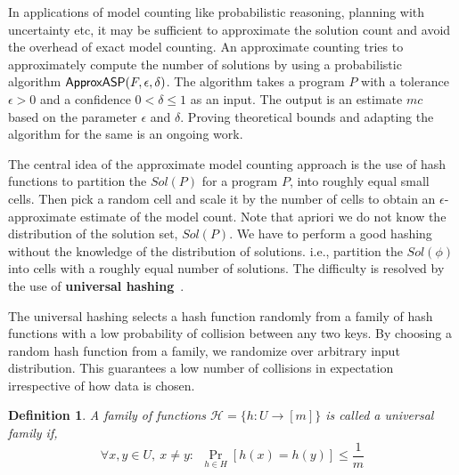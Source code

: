 \documentclass{article}
\newtheorem{definition}{Definition}
\newcommand{\fff}{$P$\xspace}
\newcommand{\mc}{$mc$\xspace}
\newcommand{\ep}{$\epsilon$\xspace}
\newcommand{\del}{$\delta$\xspace}
\def\appasp{\normalfont \textsf{ApproxASP}\xspace}
\newcommand{\sol}{$Sol(P)$\xspace}
\begin{document}
In applications of model counting like probabilistic reasoning, planning with uncertainty etc, it may be sufficient to approximate the solution count and avoid the overhead of exact model counting.
%
An approximate counting tries to approximately compute the number of solutions by using a probabilistic algorithm $\appasp(F, \epsilon, \delta)$.
%
The algorithm takes a program \fff with a tolerance $\epsilon > 0$ and a confidence $0 < \delta \leq 1$ as an input.
%
The output is an estimate \mc based on the parameter \ep and \del.
%
Proving theoretical bounds and adapting the algorithm for the same is an ongoing work.

The central idea of the approximate model counting approach is the use of hash functions to partition the \sol for a program \fff, into roughly equal small cells.
%
Then pick a random cell and scale it by the number of cells to obtain an \ep-approximate estimate of the model count.
%
Note that apriori we do not know the distribution of the solution set, \sol.
%
We have to perform a good hashing without the knowledge of the distribution of solutions. i.e., partition the $Sol(\phi)$ into cells with a roughly equal number of solutions.
%
%
%
The difficulty is resolved by the use of \textbf{universal hashing}~\cite{DBLP:conf/stoc/CarterW77}.

The universal hashing selects a hash function randomly from a family of hash functions with a low probability of collision between any two keys. 
%
By choosing a random hash function from a family, we randomize over arbitrary input distribution. This guarantees a low number of collisions in expectation irrespective of how data is chosen.

\begin{definition}
A family of functions $\mathcal{H}=\{h: U \to [m]\}$  is called a universal family if,
\[ \forall x,y\in U,~x\neq y:~~\Pr _{h\in H}[h(x)=h(y)]\leq {\frac {1}{m}} \]
\end{definition}
\end{document}
